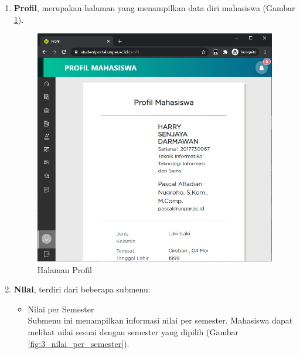 \begin{enumerate}
    \item \textbf{Profil}, merupakan halaman yang menampilkan data diri mahasiswa (Gambar \ref{fig:3_profil}).
    
    \begin{figure}[H]
    	\centering
    	\includegraphics[scale=0.45]{Gambar/profil.png}
    	\caption{Halaman Profil} 
    	\label{fig:3_profil}
    \end{figure}
    
    \item \textbf{Nilai}, terdiri dari beberapa submenu:
    
    \begin{itemize}
        \item Nilai per Semester\\
        Submenu ini menampilkan informasi nilai per semester. Mahasiswa dapat melihat nilai sesuai dengan semester yang dipilih (Gambar \ref{fig:3_nilai_per_semester}).
        

\end{itemize}
\end{enumerate}
